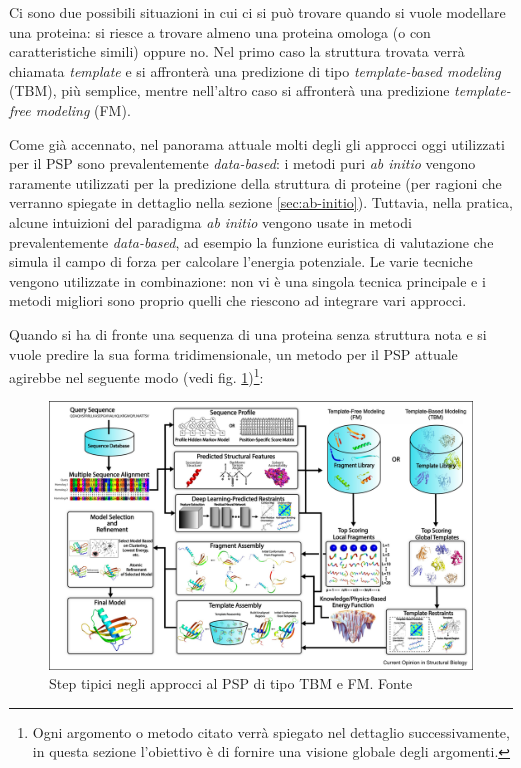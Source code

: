{Ci sono due possibili situazioni in cui ci si può trovare quando si vuole modellare una proteina: si riesce a trovare almeno una proteina omologa (o con caratteristiche simili) oppure no. Nel primo caso la struttura trovata verrà chiamata \textit{template} e si affronterà una predizione di tipo \textit{template-based modeling} (TBM), più semplice, mentre nell'altro caso si affronterà una predizione \textit{template-free modeling} (FM).\\


\par Come già accennato, nel panorama attuale molti degli gli approcci oggi utilizzati per il PSP sono prevalentemente \textit{data-based}: i metodi puri \textit{ab initio} vengono raramente utilizzati per la predizione della struttura di proteine (per ragioni che verranno spiegate in dettaglio nella sezione \ref{sec:ab-initio}). Tuttavia, nella pratica, alcune intuizioni del paradigma \textit{ab initio} vengono usate in metodi prevalentemente \textit{data-based}, ad esempio la funzione euristica di valutazione che simula il campo di forza per calcolare l'energia potenziale. Le varie tecniche vengono utilizzate in combinazione: non vi è una singola tecnica principale e i metodi migliori sono proprio quelli che riescono ad integrare vari approcci. \\

\par  Quando si ha di fronte una sequenza di una proteina senza struttura nota e si vuole predire la sua forma tridimensionale, un metodo per il PSP attuale agirebbe nel seguente modo (vedi fig. \ref{fig:fm-tbm})\footnote{Ogni argomento o metodo citato verrà spiegato nel dettaglio successivamente, in questa sezione l'obiettivo è di fornire una visione globale degli argomenti.}:

\begin{figure}[!htb]
	\centering
	\includegraphics[scale=0.95]{images/FM-TBM.jpg}
	\caption{Step tipici negli approcci al PSP di tipo TBM e FM. Fonte\cite{pearce2021deep}}
	\label{fig:fm-tbm}
\end{figure}

}
